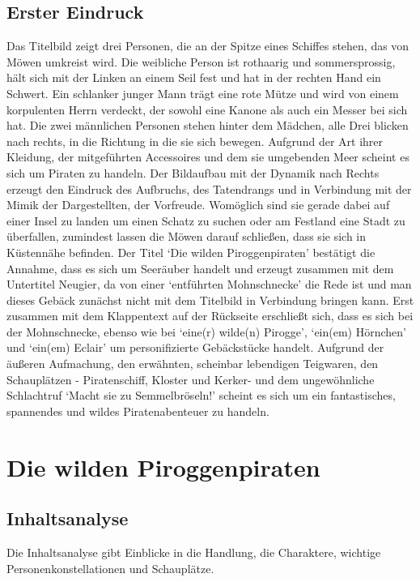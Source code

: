 \section{Erster Eindruck}
Das Titelbild zeigt drei Personen, die an der Spitze eines Schiffes stehen, das von Möwen umkreist wird. Die weibliche Person ist rothaarig und sommersprossig, hält sich mit der Linken an einem Seil fest und hat in der rechten Hand ein Schwert. Ein schlanker junger Mann trägt eine rote Mütze und wird von einem korpulenten Herrn verdeckt, der sowohl eine Kanone als auch ein Messer bei sich hat. Die zwei männlichen Personen stehen hinter dem Mädchen, alle Drei blicken nach rechts, in die Richtung in die sie sich bewegen. Aufgrund der Art ihrer Kleidung, der mitgeführten Accessoires und dem sie umgebenden Meer scheint es sich um Piraten zu handeln. Der Bildaufbau mit der Dynamik nach Rechts erzeugt den Eindruck des Aufbruchs, des Tatendrangs und in Verbindung mit der Mimik der Dargestellten, der Vorfreude. Womöglich sind sie gerade dabei auf einer Insel zu landen um einen Schatz zu suchen oder am Festland eine Stadt zu überfallen, zumindest lassen die Möwen darauf schließen, dass sie sich in Küstennähe befinden.
Der Titel `Die wilden Piroggenpiraten' bestätigt die Annahme, dass es sich um Seeräuber handelt und erzeugt zusammen mit dem Untertitel Neugier, da von einer `entführten Mohnschnecke' die Rede ist und man dieses Gebäck zunächst nicht mit dem Titelbild in Verbindung bringen kann. Erst zusammen mit dem Klappentext auf der Rückseite erschließt sich, dass es sich bei der Mohnschnecke, ebenso wie bei `eine(r) wilde(n) Pirogge', `ein(em) Hörnchen' und `ein(em) Eclair' um personifizierte Gebäckstücke handelt. Aufgrund der äußeren Aufmachung, den erwähnten, scheinbar lebendigen Teigwaren, den Schauplätzen - Piratenschiff, Kloster und Kerker- und dem ungewöhnliche Schlachtruf `Macht sie zu Semmelbröseln!' scheint es sich um ein fantastisches, spannendes und wildes Piratenabenteuer zu handeln.

\chapter{Die wilden Piroggenpiraten}

\section{Inhaltsanalyse}
Die Inhaltsanalyse gibt Einblicke in die Handlung, die Charaktere, wichtige Personenkonstellationen und Schauplätze.


